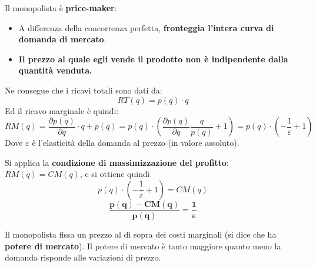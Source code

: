 \documentclass[../main.tex]{subfiles}
\begin{document}
Il monopolista è \textbf{price-maker}:
\begin{itemize}
    \item A differenza della concorrenza perfetta, \textbf{fronteggia l'intera curva di domanda di mercato}.
    \item \textbf{Il prezzo al quale egli vende il prodotto non è indipendente dalla quantità venduta.}
\end{itemize}

Ne consegue che i ricavi totali sono dati da:
$$RT(q) = p(q)\cdot q$$
Ed il ricavo marginale è quindi:
$$
RM(q)=\frac{\partial p(q)}{\partial q}\cdot q + p(q) = p(q)\cdot \left(\frac{\partial p(q)}{\partial q}\frac{q}{p(q)}+1\right)=p(q)\cdot \left(-\frac{1}{\varepsilon}+1\right)
$$
Dove $\varepsilon$ è l'elasticità della domanda al prezzo (in valore assoluto).

Si applica la \textbf{condizione di massimizzazione del profitto}: $RM(q) = CM(q)$, e si ottiene quindi
$$p(q)\cdot \left(-\frac{1}{\varepsilon}+1\right)=CM(q)$$
$$\mathbf{\frac{p(q)-CM(q)}{p(q)} = \frac{1}{\bm\varepsilon}}$$

Il monopolista fissa un prezzo al di sopra dei costi marginali (si dice che ha \textbf{potere di mercato}). Il potere di mercato è tanto maggiore quanto meno la domanda risponde alle variazioni di prezzo.
\end{document}
